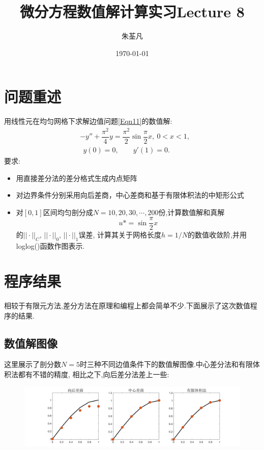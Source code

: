 \documentclass[11pt,reqno]{article}
\numberwithin{equation}{section}
\begin{document}
\title{微分方程数值解计算实习Lecture 8}

\author{朱荃凡}
\date{\today}

\maketitle

\vspace{50pt}

\section{问题重述}
用线性元在均匀网格下求解边值问题\eqref{Eqn11}的数值解:
\begin{equation}\label{Eqn11}
	\begin{split}
	&-y''+\dfrac{\pi^2}{4}y=\dfrac{\pi^2}{2}\sin\dfrac{\pi}{2}x,\ 0<x<1,\\
	&\ \ y(0)=0,\qquad y'(1)=0.
	\end{split}
\end{equation}
要求:
\begin{itemize}
	\item  用直接差分法的差分格式生成内点矩阵
	\item  对边界条件分别采用向后差商，中心差商和基于有限体积法的中矩形公式
	\item 对$[0,1]$区间均匀剖分成$N=10,20,30,\cdots,200$份,计算数值解和真解
	 \[u*=\sin\dfrac{\pi}{2}x\]
	的$||\cdot||_C,\,||\cdot||_0,\,||\cdot||_1$误差,
	计算其关于网格长度$h=1/N$的数值收敛阶,并用loglog()函数作图表示.
\end{itemize}


\newpage


\section{程序结果}
相较于有限元方法,差分方法在原理和编程上都会简单不少.下面展示了这次数值程序的结果.

\subsection{数值解图像}
这里展示了剖分数$N=5$时三种不同边值条件下的数值解图像.中心差分法和有限体积法都有不错的精度,
相比之下,向后差分法差上一些:
\begin{figure}[h]
	\centering
	  \includegraphics[width=\textwidth]{solution.jpg}
\end{figure}
\end{document}
